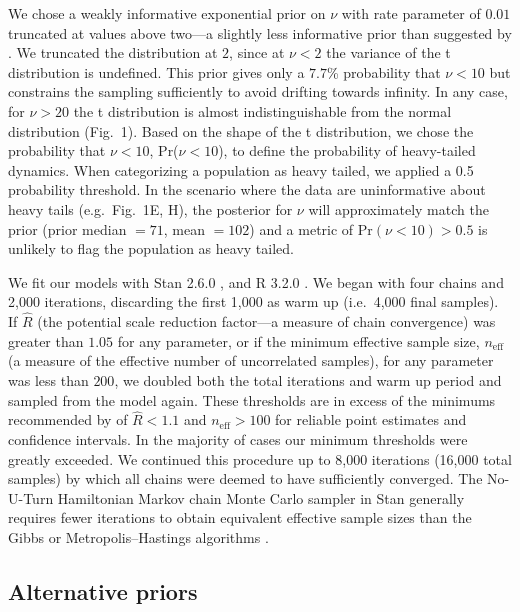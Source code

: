 We chose a weakly informative exponential prior on \(\nu\) with rate parameter
of \(0.01\) truncated at values above two---a slightly less informative prior
than suggested by \citet{fernandez1998}. We truncated the
distribution at \(2\), since at \(\nu < 2\) the variance of the t distribution
is undefined. This prior gives only a \(7.7\)\% probability that \(\nu < 10\)
but constrains the sampling sufficiently to avoid drifting towards infinity. In
any case, for \(\nu > 20\) the t distribution is almost indistinguishable from
the normal distribution (Fig.~1). Based on the shape of the t distribution, we
chose the probability that \(\nu < 10\), Pr(\(\nu < 10\)), to define the
probability of heavy-tailed dynamics. When categorizing a population as heavy
tailed, we applied a 0.5 probability threshold. In the scenario where the data
are uninformative about heavy tails (e.g.~Fig.~1E, H), the posterior for
\(\nu\) will approximately match the prior (prior median \(= 71\), mean \(=
102\)) and a metric of Pr\((\nu < 10) > 0.5\) is unlikely to flag the
population as heavy tailed.

We fit our models with Stan 2.6.0 \citep{stan-manual2015, hoffman2014}, and R
3.2.0 \citep{r2015}. We began with four chains and 2,000 iterations, discarding
the first 1,000 as warm up (i.e.~4,000 final samples). If \(\hat{R}\) (the
potential scale reduction factor---a measure of chain convergence) was greater
than \(1.05\) for any parameter, or if the minimum effective sample size,
\(n_\mathrm{eff}\) (a measure of the effective number of uncorrelated samples),
for any parameter was less than \(200\), we doubled both the total iterations
and warm up period and sampled from the model again. These thresholds are in
excess of the minimums recommended by \citet{gelman2006a} of
\(\hat{R} < 1.1\) and \(n_\mathrm{eff} > 100\) for reliable point estimates and
confidence intervals. In the majority of cases our minimum thresholds were
greatly exceeded. We continued this procedure up to 8,000 iterations (16,000
total samples) by which all chains were deemed to have sufficiently converged.
The No-U-Turn Hamiltonian Markov chain Monte Carlo sampler in Stan generally
requires fewer iterations to obtain equivalent effective sample sizes than the
Gibbs or Metropolis--Hastings algorithms \citep{stan-manual2015}.

\subsection{Alternative priors}

